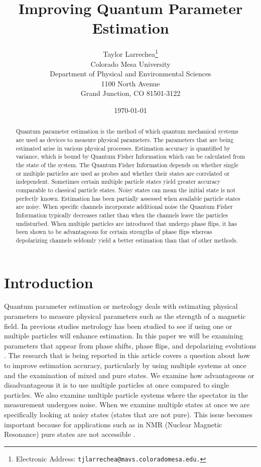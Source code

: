 \documentclass[twocolumn]{article}
\title{\textbf{Improving Quantum Parameter Estimation}}
\author{Taylor Larrechea\footnote{Electronic Address: \texttt{tjlarrechea@mavs.coloradomesa.edu.}} \\
    Colorado Mesa University \\
    Department of Physical and Environmental Sciences \\
    1100 North Avenue \\
    Grand Junction, CO 81501-3122}
\date{\today}
\begin{document}
\maketitle
\begin{abstract}
Quantum parameter estimation is the method of which quantum mechanical systems are used as devices to measure physical parameters. The parameters that are being estimated arise in various physical processes. Estimation accuracy is quantified by variance, which is bound by Quantum Fisher Information which can be calculated from the state of the system. The Quantum Fisher Information depends on whether single or multiple particles are used as probes and whether their states are correlated or independent. Sometimes certain multiple particle states yield greater accuracy comparable to classical particle states. Noisy states can mean the initial state is not perfectly known. Estimation has been partially assessed when available particle states are noisy. When specific channels incorporate additional noise the Quantum Fisher Information typically decreases rather than when the channels leave the particles undisturbed. When multiple particles are introduced that undergo phase flips, it has been shown to be advantageous for certain strengths of phase flips whereas depolarizing channels seldomly yield a better estimation than that of other methods.
\end{abstract}
\section*{Introduction}
Quantum parameter estimation or metrology deals with estimating physical parameters to measure physical parameters such as the strength of a magnetic field. In previous studies metrology has been studied to see if using one or multiple particles will enhance estimation. In this paper we will be examining parameters that appear from phase shifts, phase flips, and depolarizing evolutions \cite{Braunstein,Caves,Helstrom,Sarovar}. The research that is being reported in this article covers a question about how to improve estimation accuracy, particularly by using multiple systems at once and the examination of mixed and pure states. We examine how advantageous or disadvantageous it is to use multiple particles at once compared to single particles. We also examine multiple particle systems where the spectator in the measurement undergoes noise. When we examine multiple states at once we are specifically looking at noisy states (states that are not pure). This issue becomes important because for applications such as in NMR (Nuclear Magnetic Resonance) pure states are not accessible \cite{D. Collins}.
\end{document}
